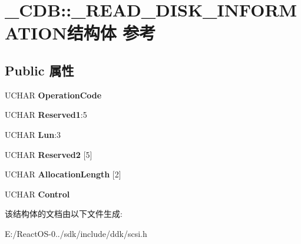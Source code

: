 \hypertarget{struct___c_d_b_1_1___r_e_a_d___d_i_s_k___i_n_f_o_r_m_a_t_i_o_n}{}\section{\+\_\+\+C\+DB\+:\+:\+\_\+\+R\+E\+A\+D\+\_\+\+D\+I\+S\+K\+\_\+\+I\+N\+F\+O\+R\+M\+A\+T\+I\+O\+N结构体 参考}
\label{struct___c_d_b_1_1___r_e_a_d___d_i_s_k___i_n_f_o_r_m_a_t_i_o_n}
\subsection*{Public 属性}
\begin{DoxyCompactItemize}
\item 
\mbox{\label{struct___c_d_b_1_1___r_e_a_d___d_i_s_k___i_n_f_o_r_m_a_t_i_o_n_acc451200c88c15cca74992b300e3196a}} 
U\+C\+H\+AR {\bfseries Operation\+Code}
\item 
\mbox{\label{struct___c_d_b_1_1___r_e_a_d___d_i_s_k___i_n_f_o_r_m_a_t_i_o_n_aa9b00192375cb62d78f648875546d61f}} 
U\+C\+H\+AR {\bfseries Reserved1}\+:5
\item 
\mbox{\label{struct___c_d_b_1_1___r_e_a_d___d_i_s_k___i_n_f_o_r_m_a_t_i_o_n_aee6a59d83b529daf72a021dd607917c0}} 
U\+C\+H\+AR {\bfseries Lun}\+:3
\item 
\mbox{\label{struct___c_d_b_1_1___r_e_a_d___d_i_s_k___i_n_f_o_r_m_a_t_i_o_n_a8dc8755d780c24182f219b858fcb38e4}} 
U\+C\+H\+AR {\bfseries Reserved2} \mbox{[}5\mbox{]}
\item 
\mbox{\label{struct___c_d_b_1_1___r_e_a_d___d_i_s_k___i_n_f_o_r_m_a_t_i_o_n_a9ccd68ea389ca8aa26eda3b4699e44c6}} 
U\+C\+H\+AR {\bfseries Allocation\+Length} \mbox{[}2\mbox{]}
\item 
\mbox{\label{struct___c_d_b_1_1___r_e_a_d___d_i_s_k___i_n_f_o_r_m_a_t_i_o_n_ac3e07e93e2dbec76e3db30fce7c65005}} 
U\+C\+H\+AR {\bfseries Control}
\end{DoxyCompactItemize}


该结构体的文档由以下文件生成\+:\begin{DoxyCompactItemize}
\item 
E\+:/\+React\+O\+S-\/0../sdk/include/ddk/scsi.\+h\end{DoxyCompactItemize}
